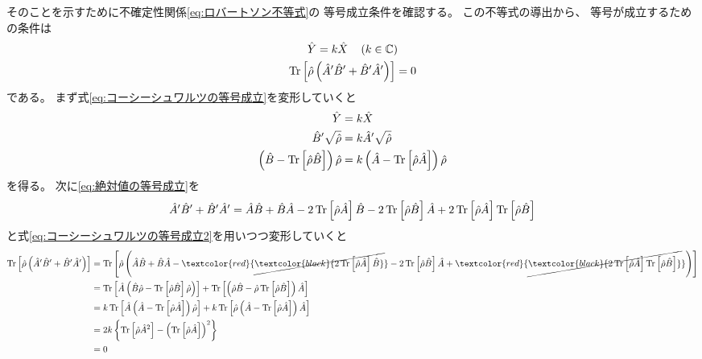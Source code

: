 \documentclass[a4paper, 10pt, uplatex]{jsarticle}
\newcommand{\redcancel}[1]{
	\textcolor{red}{\cancel{\textcolor{black}{#1}}}
}
\begin{document}
そのことを示すために不確定性関係\eqref{eq:ロバートソン不等式}の
等号成立条件を確認する。
この不等式の導出から、
等号が成立するための条件は
\begin{gather}
	\hat{Y} = k \hat{X} \quad \left( k \in \mathbb{C} \right)
	\label{eq:コーシーシュワルツの等号成立} \\
	\operatorname*{Tr} \left[ \hat{\rho} \left( \hat{A}' \hat{B}'
	+ \hat{B}' \hat{A}' \right) \right] = 0
	\label{eq:絶対値の等号成立}
\end{gather}
である。
まず式\eqref{eq:コーシーシュワルツの等号成立}を変形していくと
\begin{align}
	\hat{Y} &= k \hat{X} \\
	\hat{B}' \sqrt{\hat{\rho}}
	&= k \hat{A}' \sqrt{\hat{\rho}} \\
	\left( \hat{B} - \operatorname*{Tr} \left[ \hat{\rho} \hat{B} \right] \right) \hat{\rho}
	&= k \left( \hat{A} - \operatorname*{Tr} \left[ \hat{\rho} \hat{A} \right] \right)
	\hat{\rho}
	\label{eq:コーシーシュワルツの等号成立2}
\end{align}
を得る。
次に\eqref{eq:絶対値の等号成立}を
\begin{align}
	\hat{A}' \hat{B}' + \hat{B}' \hat{A}'
	= \hat{A} \hat{B} + \hat{B} \hat{A}
	- 2\operatorname*{Tr} \left[ \hat{\rho} \hat{A} \right] \hat{B}
	- 2\operatorname*{Tr} \left[ \hat{\rho} \hat{B} \right] \hat{A}
	+ 2\operatorname*{Tr} \left[ \hat{\rho} \hat{A} \right]
	\operatorname*{Tr} \left[ \hat{\rho} \hat{B} \right]
\end{align}
と式\eqref{eq:コーシーシュワルツの等号成立2}を用いつつ変形していくと
\begin{align}
	\Tr \left[ \hat{\rho} \left( \hat{A}' \hat{B}'
	+ \hat{B}' \hat{A}' \right) \right]
	&= \Tr \left[ \hat{\rho} \left( \hat{A} \hat{B} + \hat{B} \hat{A}
	- \redcancel{2\Tr \left[ \hat{\rho} \hat{A} \right] \hat{B}}
	- 2\Tr \left[ \hat{\rho} \hat{B} \right] \hat{A}
	+ \redcancel{2\Tr \left[ \hat{\rho} \hat{A} \right]
	\Tr \left[ \hat{\rho} \hat{B} \right]}
	\right) \right] \\
	&= \Tr \left[ \hat{A} \left( \hat{B} \hat{\rho}
	- \Tr \left[ \hat{\rho} \hat{B} \right] \hat{\rho} \right) \right]
	+ \Tr \left[ \left( \hat{\rho} \hat{B}
	- \hat{\rho} \Tr \left[ \hat{\rho} \hat{B} \right] \right)
	\hat{A} \right] \\
	&= k \Tr \left[ \hat{A} 
	\left( \hat{A} - \Tr \left[ \hat{\rho} \hat{A} \right] \right)
	\hat{\rho} \right]
	+ k \Tr \left[ \hat{\rho}
	\left( \hat{A} - \Tr \left[ \hat{\rho} \hat{A} \right] \right)
	\hat{A} \right] \\
	&= 2k \left\{ \Tr \left[ \hat{\rho} \hat{A}^2 \right]
	- \left( \Tr \left[ \hat{\rho} \hat{A} \right] \right)^2 \right\} \\
	&= 0
\end{align}
\end{document}
